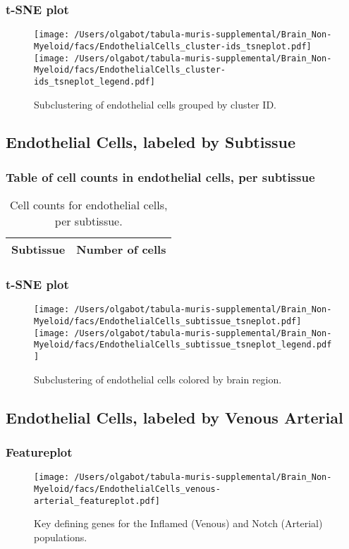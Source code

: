 \newpage
\subsubsection{t-SNE plot}
\begin{figure}[h]
\centering
\texttt{[image: /Users/olgabot/tabula-muris-supplemental/Brain\_Non-Myeloid/facs/EndothelialCells\_cluster-ids\_tsneplot.pdf]}
\texttt{[image: /Users/olgabot/tabula-muris-supplemental/Brain\_Non-Myeloid/facs/EndothelialCells\_cluster-ids\_tsneplot\_legend.pdf]}
\caption{Subclustering of endothelial cells grouped by cluster ID.
}
\end{figure}


\newpage
\subsection{Endothelial Cells, labeled by Subtissue}
\subsubsection{Table of cell counts in endothelial cells, per subtissue}\begin{table}[h]
\centering
\label{my-label}
\begin{tabular}{@{}ll@{}}
\toprule

Subtissue& Number of cells \\ \midrule\bottomrule
\end{tabular}
\caption{Cell counts for endothelial cells, per subtissue.}
\end{table}

\newpage
\subsubsection{t-SNE plot}
\begin{figure}[h]
\centering
\texttt{[image: /Users/olgabot/tabula-muris-supplemental/Brain\_Non-Myeloid/facs/EndothelialCells\_subtissue\_tsneplot.pdf]}
\texttt{[image: /Users/olgabot/tabula-muris-supplemental/Brain\_Non-Myeloid/facs/EndothelialCells\_subtissue\_tsneplot\_legend.pdf]}
\caption{Subclustering of endothelial cells colored by brain region.
}
\end{figure}


\newpage
\subsection{Endothelial Cells, labeled by Venous Arterial}

\newpage
\subsubsection{Featureplot}
\begin{figure}[h]
\centering
\texttt{[image: /Users/olgabot/tabula-muris-supplemental/Brain\_Non-Myeloid/facs/EndothelialCells\_venous-arterial\_featureplot.pdf]}

\caption{Key defining genes for the Inflamed (Venous) and Notch (Arterial) populations.
}
\end{figure}

